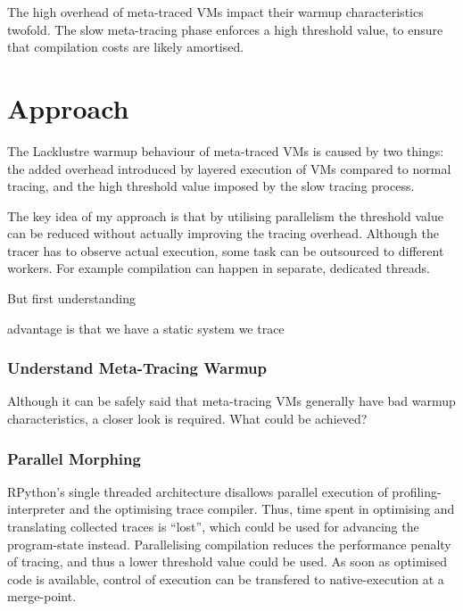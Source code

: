 The high overhead of meta-traced VMs impact their warmup characteristics
twofold. The slow meta-tracing phase enforces a high threshold value, to ensure
that compilation costs are likely amortised.

\section{Approach}

The Lacklustre warmup behaviour of meta-traced VMs is caused by two things: the
added overhead introduced by layered execution of VMs compared to normal
tracing, and the high threshold value imposed by the slow tracing process.

The key idea of my approach is that by utilising parallelism the threshold value
can be reduced without actually improving the tracing overhead. Although the
tracer has to observe actual execution, some task can be outsourced to different
workers. For example compilation can happen in separate, dedicated threads.

But first understanding 

advantage is that we have a static system we trace


\subsubsection{Understand Meta-Tracing Warmup}

Although it can be safely said that meta-tracing VMs generally have bad warmup
characteristics, a closer look is required. What could be achieved?



\subsubsection{Parallel Morphing} RPython's single threaded architecture disallows
parallel execution of profiling-interpreter and the optimising trace compiler.
Thus, time spent in optimising and translating collected traces is ``lost'',
which could be used for advancing the program-state instead. Parallelising
compilation reduces the performance penalty of tracing, and thus a lower
threshold value could be used. As soon as optimised code is available, control
of execution can be transfered to native-execution at a merge-point.

